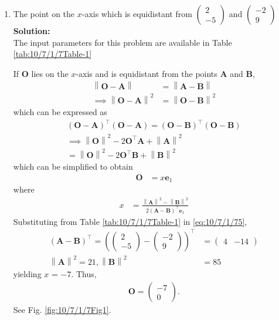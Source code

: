\documentclass[12pt]{article}
\providecommand{\brak}[1]{\ensuremath{\left(#1\right)}}
\providecommand{\norm}[1]{\left\lVert#1\right\rVert}
\newcommand{\solution}{\noindent \textbf{Solution: }}
\newcommand{\myvec}[1]{\ensuremath{\begin{pmatrix}#1\end{pmatrix}}}
\let\vec\mathbf
\begin{document}
\begin{enumerate}

\item The point on the $x$-axis which is equidistant from $\myvec{2 \\ -5}$ and $\myvec{-2\\9}$\\
\solution \\
\fi
		The input parameters for this problem are available in Table \ref{tab:10/7/1/7Table-1}
\begin{table}[ht!]

\caption{}
\label{tab:10/7/1/7Table-1}	
\end{table}
%
  If $\vec{O}$ lies on the  $x$-axis and is  equidistant from the points $\vec{A}$ and $\vec{B}$, 
\begin{align}
 \norm{\vec{O}-\vec{A}} &=
\norm{\vec{A}-\vec{B}} 
\\
 \implies \norm{\vec{O}-\vec{A}}^2 &=
\norm{\vec{O}-\vec{B}}^2 
\end{align}
which can be expressed as 
\begin{multline}
 \brak{\vec{O}-\vec{A}}^{\top} \brak{\vec{O}-\vec{A}}=
 \brak{\vec{O}-\vec{B}}^{\top} 
\brak{\vec{O}-\vec{B}}
\\
 \implies \norm{\vec{O}}^2-2{\vec{O}}^{\top}\vec{A} + \norm{\vec{A}}^2
 \\= \norm{\vec{O}}^2-2{\vec{O}}^{\top}\vec{B} + \norm{\vec{B}}^2
\end{multline}
which can be simplified to obtain
  \begin{align}
   \vec{O} &=
    x\vec{e}_1
  \end{align}
  where 
  \begin{align}
   x &=\frac{\norm{\vec{A}}^2 -\norm{\vec{B}}^2 }{2\brak{\vec{A}-\vec{B}}^{\top }\vec{e}_1
}\label{eq:10/7/1/75}  
  \end{align}
  Substituting from Table \eqref{tab:10/7/1/7Table-1} in \eqref{eq:10/7/1/75},
\begin{align}
 \brak{\vec{A}-\vec{B}}^{\top}=
 \brak{\myvec{2 \\ -5}-\myvec{-2\\9}}^{\top}
	&=\myvec{4 & -14}
	\\
	\norm{\vec{A}}^2 = 21,
	\norm{\vec{B}}^2 &= 85
    \end{align}
yielding $x$ = $ -7$.  Thus, 
		\begin{align}
\vec{O} = \myvec{ -7 \\ 0}.
		\end{align}
		See Fig. 
\ref{fig:10/7/1/7Fig1}.


\end{enumerate}
\end{document}
